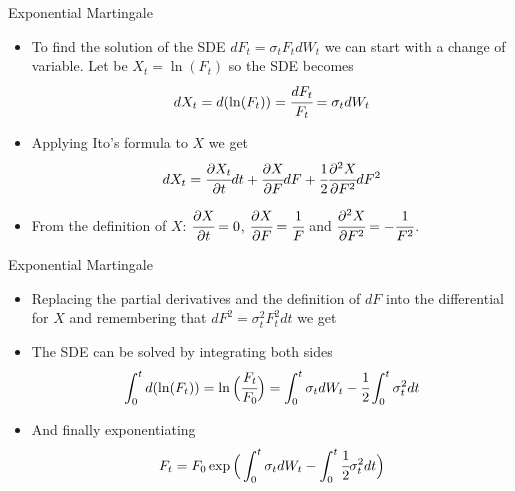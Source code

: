 \documentclass{beamer}
\begin{document}
\begin{frame}{Exponential Martingale}
 \begin{itemize}
	\item<1-> To find the solution of the SDE $dF_t = \sigma_tF_tdW_t$ we can start with a change of variable. Let be $X_t=\ln(F_t)$ so the SDE becomes
	\begin{equation*}
	dX_t = d(\ln(F_t)) = \cfrac{dF_t}{F_t}=\sigma_tdW_t
   \end{equation*}
  \item<2-> Applying Ito's formula to $X$ we get
	\begin{equation*}
		dX_t = \cfrac{\partial X_t}{\partial t}dt + \cfrac{\partial X}{\partial F}dF + \cfrac{1}{2}\cfrac{\partial^2 X}{\partial F^2}dF^2
   \end{equation*}
	\item<3-> From the definition of $X$: $\cfrac{\partial X}{\partial t}=0$, $\cfrac{\partial X}{\partial F}=\cfrac{1}{F}$ and $\cfrac{\partial^2 X}{\partial F^2}=-\cfrac{1}{F^2}$.
\end{itemize}
\end{frame}

\begin{frame}{Exponential Martingale}
 \begin{itemize}
	\item<1-> Replacing the partial derivatives and the definition of $dF$ into the differential for $X$ and remembering that $dF^2 = \sigma_t^2 F_t^2 dt$ we get
  \item<3-> The SDE can be solved by integrating both sides
	\begin{equation*}
	\int_0^t d(\ln(F_t)) = \ln\Big(\cfrac{F_t}{F_0}\Big)= \int_0^t \sigma_t dW_t - \cfrac{1}{2}\int_0^t\sigma_t^2 dt  
	\end{equation*}
  \item<4-> And finally exponentiating
	\begin{equation*}
		F_t = F_0 \exp\Big(\int_0^t \sigma_t dW_t - \int_0^t\cfrac{1}{2}\sigma_t^2 dt\Big)
	\end{equation*}
\end{itemize}
\end{frame}
\end{document}

